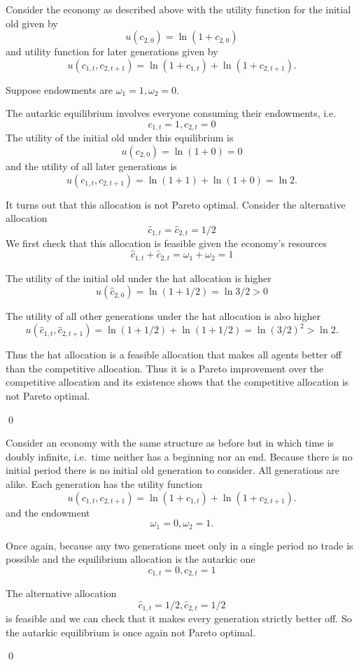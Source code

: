 \documentclass[11pt,reqno,openany]{amsbook}
\begin{document}
\begin{exmp}\label{exmp:olg-np-single}
Consider the economy as described above with the utility function
for the initial old given by
\[u(c_{2,0})=\ln(1+c_{2,0})\]
and utility function for later generations given by
\[u(c_{1,t},c_{2,t+1})=\ln(1+c_{1,t})+\ln(1+c_{2,t+1}).\]

Suppose endowments are $\omega_1=1,\omega_2=0$.

The autarkic equilibrium involves everyone consuming their endowments,
i.e.
\[c_{1,t}=1, c_{2,t}=0\]
The utility of the initial old under this equilibrium is
\[u(c_{2,0})=\ln (1+0)=0\]
and the utility of all later generations is
\[u(c_{1,t},c_{2,t+1})=\ln(1+1)+\ln(1+0)=\ln 2.\]

It turns out that this allocation is not Pareto optimal. Consider the
alternative allocation
\[\hat c_{1,t}=\hat c_{2,t}=1/2\]
We first check that this allocation is feasible given the economy's
resources
\[\hat c_{1,t}+\hat c_{2,t}=\omega_1+\omega_2=1\]

The utility of the initial old under the hat allocation is higher
\[u(\hat c_{2,0})=\ln (1+1/2) = \ln 3/2 >0\]

The utility of all other generations under the hat allocation is also
higher
\[u(\hat c_{1,t},\hat c_{2,t+1})=\ln (1+1/2)+\ln(1+1/2)=\ln (3/2)^2 >
\ln 2.\]

Thus the hat allocation is a feasible allocation that makes all agents
better off than the competitive allocation. Thus it is a Pareto
improvement over the competitive allocation and its existence shows
that the competitive allocation is not Pareto optimal.

\qed
\end{exmp}

\begin{exmp}\label{exmp:olg-np-double}
Consider an economy with the same structure as before but in which
time is doubly infinite, i.e.\ time neither has a beginning nor an
end. Because there is no initial period there is no initial old
generation to consider. All generations are alike. Each generation has
the utility function
\[u(c_{1,t},c_{2,t+1})=\ln(1+c_{1,t})+\ln(1+c_{2,t+1}).\]
and the endowment
\[\omega_1=0, \omega_2=1.\]

Once again, because any two generations meet only in a single period
no trade is possible and the equilibrium allocation is the autarkic
one
\[c_{1,t}=0, c_{2,t}=1\]

The alternative allocation
\[\hat c_{1,t}=1/2, \hat c_{2,t}=1/2\]
is feasible and we can check that it makes every generation strictly
better off. So the autarkic equilibrium is once again not Pareto
optimal.

\qed
\end{exmp}
\end{document}
